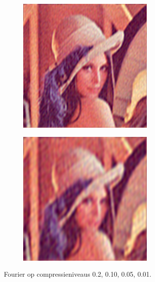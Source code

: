 \documentclass[11pt]{report}
\theoremstyle{plain}
\theoremstyle{remark}
\begin{document}
\begin{figure}
\begin{subfigure}[b]{0.24\textwidth}
	\end{subfigure}
	\begin{subfigure}[b]{0.24\textwidth}
		\centering
		\includegraphics[width=\textwidth]{plaatjes/Lenna_fourier_0_03.png}
	\end{subfigure}
	\begin{subfigure}[b]{0.24\textwidth}
		\centering
		\includegraphics[width=\textwidth]{plaatjes/Lenna_fourier_0_01.png}
	\end{subfigure}
	\caption{Fourier op compressieniveaus 0.2, 0.10, 0.05, 0.01.}
\end{figure}
\end{document}
